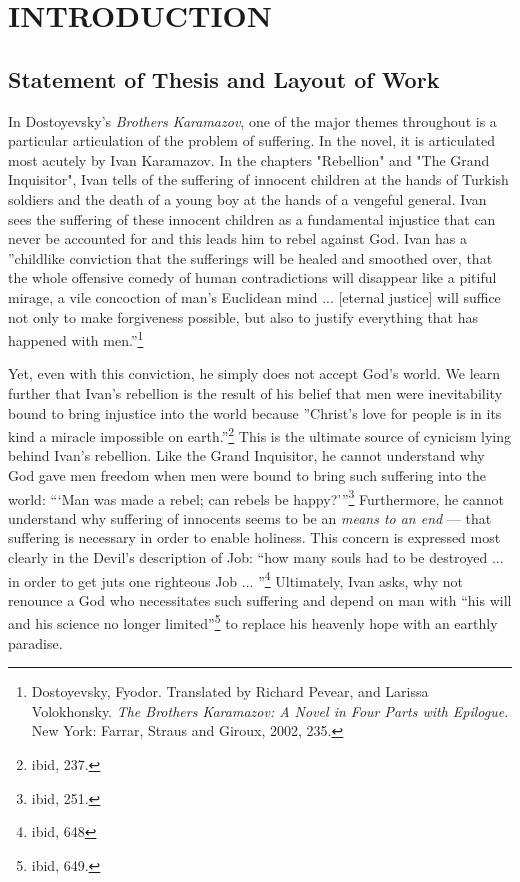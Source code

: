 \tableofcontents
\chapter{INTRODUCTION}

\pagestyle{myheadings}

\label{introduction}

\section{Statement of Thesis and Layout of Work}

In Dostoyevsky's \emph{Brothers Karamazov}, one of the major themes throughout is a particular articulation of the problem of suffering. In the novel, it is articulated most acutely by Ivan Karamazov. In the chapters "Rebellion" and "The Grand Inquisitor", Ivan tells of the suffering of innocent children at the hands of Turkish soldiers and the death of a young boy at the hands of a vengeful general. Ivan sees the suffering of these innocent children as a fundamental injustice that can never be accounted for and this leads him to rebel against God. Ivan has a ''childlike conviction that the sufferings will be healed and smoothed over, that the whole offensive comedy of human contradictions will disappear like a pitiful mirage, a vile concoction of man's Euclidean mind ... [eternal justice] will suffice not only to make forgiveness possible, but also to justify everything that has happened with men.''\footnote{Dostoyevsky, Fyodor. Translated by Richard Pevear, and Larissa Volokhonsky. \emph{The Brothers Karamazov: A Novel in Four Parts with Epilogue}. New York: Farrar, Straus and Giroux, 2002, 235.} 

Yet, even with this conviction, he simply does not accept God's world. We learn further that Ivan's rebellion is the result of his belief that men were inevitability bound to bring injustice into the world because ''Christ's love for people is in its kind a miracle impossible on earth.''\footnote{ibid, 237.} This is the ultimate source of cynicism lying behind Ivan's rebellion. Like the Grand Inquisitor, he cannot understand why God gave men freedom when men were bound to bring such suffering into the world: ```Man was made a rebel; can rebels be happy?'''\footnote{ibid, 251.} Furthermore, he cannot understand why suffering of innocents seems to be an \emph{means to an end} --- that suffering is necessary in order to enable holiness. This concern is expressed most clearly in the Devil's description of Job: ``how many souls had to be destroyed ... in order to get juts one righteous Job ... ''\footnote{ibid, 648} Ultimately, Ivan asks, why not renounce a God who necessitates such suffering and depend on man with ``his will and his science no longer limited''\footnote{ibid, 649.} to replace his heavenly hope with an earthly paradise.

